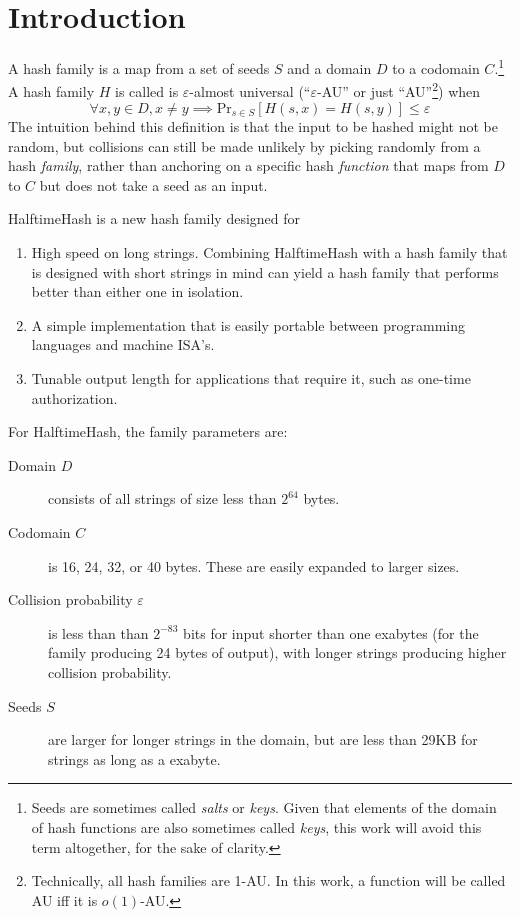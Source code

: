 \documentclass[sigconf, nonacm]{acmart}
\begin{document}
\section{Introduction}
A hash family is a map from a set of seeds $S$ and a domain $D$ to a codomain $C$.\footnote{Seeds are sometimes called {\em salts} or {\em keys}. Given that elements of the domain of hash functions are also sometimes called {\em keys}, this work will avoid this term altogether, for the sake of clarity.}
A hash family $H$ is called is $\varepsilon$-almost universal (``$\varepsilon$-AU'' or just ``AU''\footnote{Technically, all hash families are 1-AU. In this work, a function will be called AU iff it is $o(1)$-AU.}) when
\[\forall x,y \in D, x \neq y \implies \mathrm{Pr}_{s \in S}[H(s, x) = H(s, y)] \leq \varepsilon\]
The intuition behind this definition is that the input to be hashed might not be random, but collisions can still be made unlikely by picking randomly from a hash {\em family}, rather than anchoring on a specific hash {\em function} that maps from $D$ to $C$ but does not take a seed as an input.

HalftimeHash is a new hash family designed for

\begin{enumerate}
\item High speed on long strings.
  Combining HalftimeHash with a hash family that is designed with short strings in mind can yield a hash family that performs better than either one in isolation. \cite{siphash,umash}
\item A simple implementation that is easily portable between programming languages and machine ISA's.
\item Tunable output length for applications that require it, such as one-time authorization. \cite{nacl}
\end{enumerate}

For HalftimeHash, the family parameters are:

\begin{description}
\item[Domain $D$] consists of all strings of size less than $2^{64}$ bytes.
\item[Codomain $C$] is 16, 24, 32, or 40 bytes.
  These are easily expanded to larger sizes.
\item[Collision probability $\varepsilon$] is less than than $2^{-83}$ bits for input shorter than one exabytes (for the family producing 24 bytes of output), with longer strings producing higher collision probability.
\item[Seeds $S$] are larger for longer strings in the domain, but are less than 29KB for strings as long as a exabyte.
\end{description}
\end{document}
